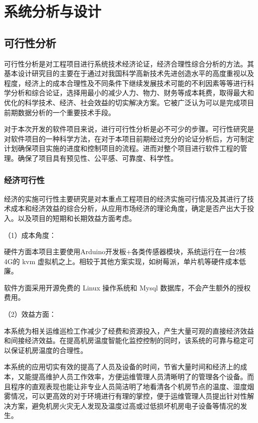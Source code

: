\section{系统分析与设计}

\subsection{可行性分析}

可行性分析是对工程项目进行系统技术经济论证，经济合理性综合分析的方法。其基本设计研究目的主要在于通过对我国科学高新技术先进创造水平的高度重视以及程度，经济上的成本合理性及不同条件下继续发展技术可能的不利因素等等进行科学分析和综合论证，选择用最小的减少人力、物力、财务等成本耗费，取得最大和优化的科学技术、经济、社会效益的切实解决方案。它被广泛认为可以是完成项目前期数据分析的一个重要技术手段。

对于本次开发的软件项目来说，进行可行性分析是必不可少的步骤。可行性研究是对软件项目的一种科学方法，在对于本项目前期经过充分的论证分析后，方可制定计划确保项目实施的进度和控制项目的流程。进而对整个项目进行软件工程的管理。确保了项目具有预见性、公平感、可靠度、科学性。

\subsubsection{经济可行性}

经济的实施可行性主要研究是对本重点工程项目的经济实施可行情况及其进行了技术成本和经济效益的综合分析，从应用市场经济的理论角度，确定是否产出大于投入。以及项目的短期和长期效益方面考虑。

（1）成本角度：

硬件方面本项目主要使用Arduino开发板+各类传感器模块，系统运行在一台2核4G的 kvm 虚拟机之上。相较于其他方案实现，如树莓派，单片机等硬件成本低廉。

软件方面采用开源免费的 Linux 操作系统和 Mysql 数据库，不会产生额外的授权费用。

（2）效益方面：

本系统为相关运维巡检工作减少了经费和资源投入，产生大量可观的直接经济效益和间接经济效益。在提高机房温度智能化监控控制的同时，该系统的可靠与稳定可以保证机房温度的合理性。

本系统的应用切实有效的提高了人员及设备的时间，节省大量时间和经济上的成本，又能提高维护人员工作效率，方便运维管理人员清晰明了的管理各个设备。而且程序的直观表现也能让非专业人员简洁明了地看清各个机房节点的温度、湿度烟雾情况，可以更高效的对于环境进行有理的掌控，便于运维管理人员提出针对性解决方案，避免机房火灾无人发现及温度过高或过低损坏机房电子设备等情况的发生。

